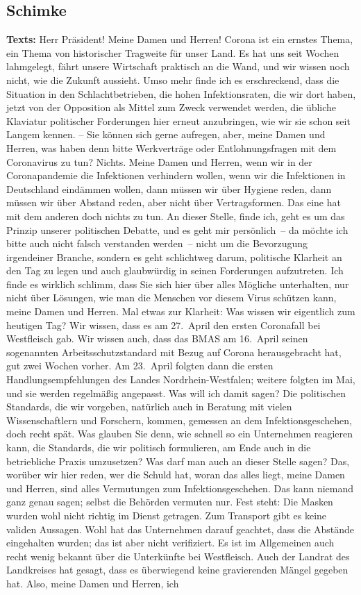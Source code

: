 \documentclass{article}
\begin{document}
\subsection{Schimke}
\noindent\textbf{Texts:} Herr Präsident! Meine Damen und Herren! Corona ist ein ernstes Thema, ein Thema von historischer Tragweite für unser Land. Es hat uns seit Wochen lahmgelegt, fährt unsere Wirtschaft praktisch an die Wand, und wir wissen noch nicht, wie die Zukunft aussieht. Umso mehr finde ich es erschreckend, dass die Situation in den Schlachtbetrieben, die hohen Infektionsraten, die wir dort haben, jetzt von der Opposition als Mittel zum Zweck verwendet werden,  die übliche Klaviatur politischer Forderungen hier erneut anzubringen,  wie wir sie schon seit Langem kennen.  – Sie können sich gerne aufregen,  aber, meine Damen und Herren, was haben denn bitte Werkverträge oder Entlohnungsfragen mit dem Coronavirus zu tun? Nichts.  Meine Damen und Herren, wenn wir in der Coronapandemie die Infektionen verhindern wollen, wenn wir die Infektionen in Deutschland eindämmen wollen, dann müssen wir über Hygiene reden,  dann müssen wir über Abstand reden, aber nicht über Vertragsformen. Das eine hat mit dem anderen doch nichts zu tun.  An dieser Stelle, finde ich, geht es um das Prinzip unserer politischen Debatte, und es geht mir persönlich – da möchte ich bitte auch nicht falsch verstanden werden – nicht um die Bevorzugung irgendeiner Branche, sondern es geht schlichtweg darum, politische Klarheit an den Tag zu legen und auch glaubwürdig in seinen Forderungen aufzutreten.  Ich finde es wirklich schlimm, dass Sie sich hier über alles Mögliche unterhalten, nur nicht über Lösungen, wie man die Menschen vor diesem Virus schützen kann, meine Damen und Herren.  Mal etwas zur Klarheit: Was wissen wir eigentlich zum heutigen Tag? Wir wissen, dass es am 27. April den ersten Coronafall bei Westfleisch gab. Wir wissen auch, dass das BMAS am 16. April seinen sogenannten Arbeitsschutzstandard mit Bezug auf Corona herausgebracht hat, gut zwei Wochen vorher. Am 23. April folgten dann die ersten Handlungsempfehlungen des Landes Nordrhein-Westfalen; weitere folgten im Mai, und sie werden regelmäßig angepasst. Was will ich damit sagen? Die politischen Standards, die wir vorgeben, natürlich auch in Beratung mit vielen Wissenschaftlern und Forschern, kommen, gemessen an dem Infektionsgeschehen, doch recht spät. Was glauben Sie denn, wie schnell so ein Unternehmen reagieren kann, die Standards, die wir politisch formulieren, am Ende auch in die betriebliche Praxis umzusetzen?  Was darf man auch an dieser Stelle sagen? Das, worüber wir hier reden, wer die Schuld hat, woran das alles liegt, meine Damen und Herren, sind alles Vermutungen zum Infektionsgeschehen. Das kann niemand ganz genau sagen; selbst die Behörden vermuten nur.  Fest steht: Die Masken wurden wohl nicht richtig im Dienst getragen. Zum Transport gibt es keine validen Aussagen. Wohl hat das Unternehmen darauf geachtet, dass die Abstände eingehalten wurden; das ist aber nicht verifiziert. Es ist im Allgemeinen auch recht wenig bekannt über die Unterkünfte bei Westfleisch. Auch der Landrat des Landkreises hat gesagt, dass es überwiegend keine gravierenden Mängel gegeben hat. Also, meine Damen und Herren, ich 
\end{document}
